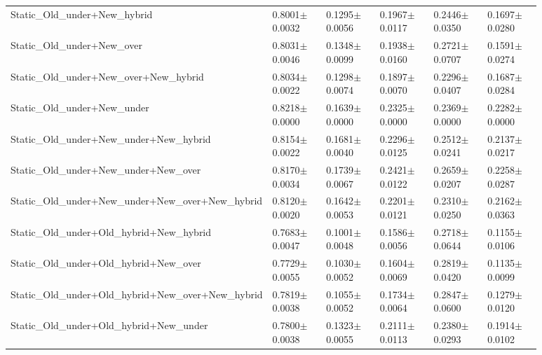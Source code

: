 \begin{longtable}{p{0.28\linewidth}p{0.12\linewidth}p{0.12\linewidth}p{0.12\linewidth}p{0.12\linewidth}p{0.12\linewidth}}
Static\_\allowbreak{}Old\_\allowbreak{}under+New\_\allowbreak{}hybrid & 0.8001\(\pm\)0.0032 & 0.1295\(\pm\)0.0056 & 0.1967\(\pm\)0.0117 & 0.2446\(\pm\)0.0350 & 0.1697\(\pm\)0.0280 \\
Static\_\allowbreak{}Old\_\allowbreak{}under+New\_\allowbreak{}over & 0.8031\(\pm\)0.0046 & 0.1348\(\pm\)0.0099 & 0.1938\(\pm\)0.0160 & 0.2721\(\pm\)0.0707 & 0.1591\(\pm\)0.0274 \\
Static\_\allowbreak{}Old\_\allowbreak{}under+New\_\allowbreak{}over+New\_\allowbreak{}hybrid & 0.8034\(\pm\)0.0022 & 0.1298\(\pm\)0.0074 & 0.1897\(\pm\)0.0070 & 0.2296\(\pm\)0.0407 & 0.1687\(\pm\)0.0284 \\
Static\_\allowbreak{}Old\_\allowbreak{}under+New\_\allowbreak{}under & 0.8218\(\pm\)0.0000 & 0.1639\(\pm\)0.0000 & 0.2325\(\pm\)0.0000 & 0.2369\(\pm\)0.0000 & 0.2282\(\pm\)0.0000 \\
Static\_\allowbreak{}Old\_\allowbreak{}under+New\_\allowbreak{}under+New\_\allowbreak{}hybrid & 0.8154\(\pm\)0.0022 & 0.1681\(\pm\)0.0040 & 0.2296\(\pm\)0.0125 & 0.2512\(\pm\)0.0241 & 0.2137\(\pm\)0.0217 \\
Static\_\allowbreak{}Old\_\allowbreak{}under+New\_\allowbreak{}under+New\_\allowbreak{}over & 0.8170\(\pm\)0.0034 & 0.1739\(\pm\)0.0067 & 0.2421\(\pm\)0.0122 & 0.2659\(\pm\)0.0207 & 0.2258\(\pm\)0.0287 \\
Static\_\allowbreak{}Old\_\allowbreak{}under+New\_\allowbreak{}under+New\_\allowbreak{}over+New\_\allowbreak{}hybrid & 0.8120\(\pm\)0.0020 & 0.1642\(\pm\)0.0053 & 0.2201\(\pm\)0.0121 & 0.2310\(\pm\)0.0250 & 0.2162\(\pm\)0.0363 \\
Static\_\allowbreak{}Old\_\allowbreak{}under+Old\_\allowbreak{}hybrid+New\_\allowbreak{}hybrid & 0.7683\(\pm\)0.0047 & 0.1001\(\pm\)0.0048 & 0.1586\(\pm\)0.0056 & 0.2718\(\pm\)0.0644 & 0.1155\(\pm\)0.0106 \\
Static\_\allowbreak{}Old\_\allowbreak{}under+Old\_\allowbreak{}hybrid+New\_\allowbreak{}over & 0.7729\(\pm\)0.0055 & 0.1030\(\pm\)0.0052 & 0.1604\(\pm\)0.0069 & 0.2819\(\pm\)0.0420 & 0.1135\(\pm\)0.0099 \\
Static\_\allowbreak{}Old\_\allowbreak{}under+Old\_\allowbreak{}hybrid+New\_\allowbreak{}over+New\_\allowbreak{}hybrid & 0.7819\(\pm\)0.0038 & 0.1055\(\pm\)0.0052 & 0.1734\(\pm\)0.0064 & 0.2847\(\pm\)0.0600 & 0.1279\(\pm\)0.0120 \\
Static\_\allowbreak{}Old\_\allowbreak{}under+Old\_\allowbreak{}hybrid+New\_\allowbreak{}under & 0.7800\(\pm\)0.0038 & 0.1323\(\pm\)0.0055 & 0.2111\(\pm\)0.0113 & 0.2380\(\pm\)0.0293 & 0.1914\(\pm\)0.0102 \\

\end{longtable}

